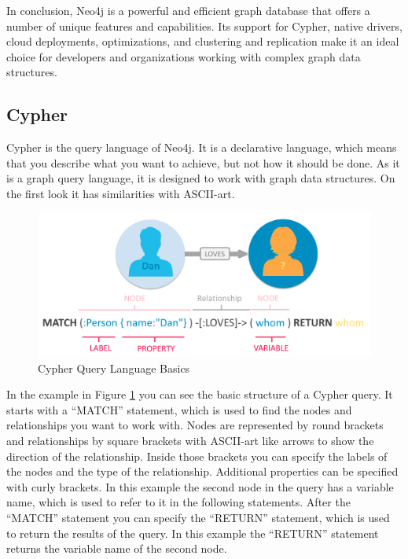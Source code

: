 In conclusion, Neo4j is a powerful and efficient graph database that offers a number of unique features and capabilities. Its support for Cypher, native drivers, cloud deployments, optimizations, and clustering and replication make it an ideal choice for developers and organizations working with complex graph data structures.

\subsection{Cypher} \label{subsec:Cypher}

Cypher is the query language of Neo4j. It is a declarative language, which means that you describe what you want to achieve, but not how it should be done. As it is a graph query language, it is designed to work with graph data structures. On the first look it has similarities with ASCII-art.

\begin{figure}[!h]
    \centering
    \includegraphics[width=1 \linewidth]{images/cypher_example.png}
    \caption{Cypher Query Language Basics \parencite{neo4j:cypher}} \label{img:cypher}
\end{figure}

In the example in Figure \ref{img:cypher} you can see the basic structure of a Cypher query. It starts with a “MATCH” statement, which is used to find the nodes and relationships you want to work with. Nodes are represented by round brackets and relationships by square brackets with ASCII-art like arrows to show the direction of the relationship. Inside those brackets you can specify the labels of the nodes and the type of the relationship. Additional properties can be specified with curly brackets. In this example the second node in the query has a variable name, which is used to refer to it in the following statements. After the “MATCH” statement you can specify the “RETURN” statement, which is used to return the results of the query. In this example the “RETURN” statement returns the variable name of the second node.

